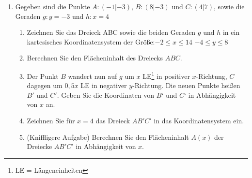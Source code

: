\documentclass{scrartcl}
\begin{document}
		
	\begin{enumerate}
		\item Gegeben sind die Punkte $A:(-1|-3)$,\; $B:(8|-3)$ und $C:(4|7)$, sowie die Geraden $g: y = -3$ und $h: x = 4$
		\begin{enumerate}
			\item Zeichnen Sie das Dreieck ABC sowie die beiden Geraden $g$ und $h$ in ein kartesisches Koordinatensystem der Größe:\quad $ -2\leq x \leq 14 $ \quad $-4 \leq y \leq 8$ 
			\item Berechnen Sie den Flächeninhalt des Dreiecks $ABC$.
			\item Der Punkt $B$ wandert nun auf $g$ um $x$ LE\footnote{LE = Längeneinheiten} in positiver $x$-Richtung, $C$ dagegen um $0,5x$ LE in negativer $y$-Richtung. Die neuen Punkte heißen $B'$ und $C'$. Geben Sie die Koordinaten von $B‘$ und $C‘$ in Abhängigkeit von $x$ an.
			\item Zeichnen Sie für $x = 4$ das Dreieck $AB'C'$ in das Koordinatensystem ein.
			\item (Kniffligere Aufgabe) Berechnen Sie den Flächeninhalt $A(x)$ der Dreiecke $AB'C'$ in Abhängigkeit von $x$.
			 \\
		\end{enumerate}
			
			
		
	\end{enumerate} 
	
	
\end{document}
